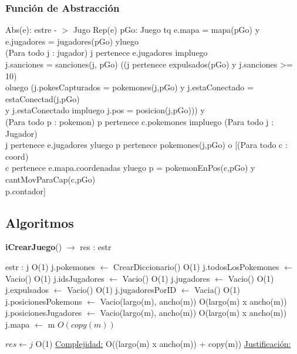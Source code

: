 \begin{Representacion}
\begin{enumerate}
	\end{enumerate}
	
\subsubsection{Funci\'on de Abstracci\'on}	
	Abs(e): estre - $>$ Jugo {Rep(e)} 
 pGo: Juego tq e.mapa = mapa(pGo) y e.jugadores = jugadores(pGo) yluego \\
 (Para todo j : jugador) j pertenece e.jugadores impluego 
 \\ j.sanciones = sanciones(j, pGo) ((j pertenece expulsados(pGo) y j.sanciones >= 10)\\
 oluego (j.pokesCapturados = pokemones(j,pGo) y j.estaConectado = estaConectad(j,pGo) \\
 y j.estaConectado impluego j.pos = posicion(j,pGo))) y \\
 (Para todo p : pokemon) p pertenece c.pokemones impluego (Para todo j : Jugador) \\
 j pertenece e.jugadores yluego p pertenece pokemones(j,pGo) o [(Para todo c : coord)\\
 c pertenece e.mapa.coordenadas yluego p = pokemonEnPos(c,pGo) y cantMovParaCap(c,pGo)\\
 p.contador]
\end{Representacion}


\subsection{Algoritmos}

\begin{algorithm}[H]{\textbf{iCrearJuego}() $\to$ res : estr}
	\begin{algorithmic}
		\State estr : j	\Comment O(1)
		\State j.pokemones $\gets$ CrearDiccionario()	\Comment O(1)
		\State j.todosLosPokemones $\gets$ Vacio()	\Comment O(1)
		\State j.idsJugadores $\gets$ Vacio()	\Comment O(1)		
		\State j.jugadores $\gets$ Vacio()	\Comment O(1)
		\State j.expulsados $\gets$ Vacio()	\Comment O(1)
		\State j.jugadoresPorID $\gets$ Vacia()	\Comment O(1)
		\State j.posicionesPokemons $\gets$	Vacio(largo(m), ancho(m))	\Comment O(largo(m) x ancho(m))
		\State j.posicionesJugadores $\gets$	Vacio(largo(m), ancho(m))	\Comment O(largo(m) x ancho(m))
		\State j.mapa $\gets$ m	\Comment $O(copy(m))$

		\State $res \gets j$ \Comment O(1)
		\medskip
		\Statex \underline{Complejidad:} O((largo(m) x ancho(m)) + copy(m))
		\Statex \underline{Justificación:} 

    \end{algorithmic}
\end{algorithm}

